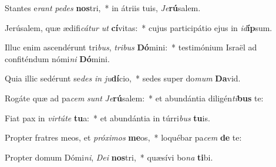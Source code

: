 \item Stantes e\textit{rant} \textit{pe}\textit{des} \textbf{nos}tri,~* in átriis tuis, \textit{Je}\textbf{rú}salem.
\item Jerúsalem, quæ ædifi\textit{cá}\textit{tur} \textit{ut} \textbf{cí}vitas:~* cujus participátio ejus in \textit{id}\textbf{íp}sum.
\item Illuc enim ascendérunt tri\textit{bus}, \textit{tri}\textit{bus} \textbf{Dó}mini:~* testimónium Israël ad confiténdum nómi\textit{ni} \textbf{Dó}mini.
\item Quia illic sedérunt se\textit{des} \textit{in} \textit{ju}\textbf{dí}cio,~* sedes super do\textit{mum} \textbf{Da}vid.
\item Rogáte quæ ad pa\textit{cem} \textit{sunt} \textit{Je}\textbf{rú}salem:~* et abundántia diligén\textit{ti}\textbf{bus} te:
\item Fiat pax in \textit{vir}\textit{tú}\textit{te} \textbf{tu}a:~* et abundántia in túrri\textit{bus} \textbf{tu}is.
\item Propter fratres meos, et \textit{pró}\textit{xi}\textit{mos} \textbf{me}os,~* loquébar pa\textit{cem} \textbf{de} te:
\item Propter domum Dómi\textit{ni}, \textit{De}\textit{i} \textbf{nos}tri,~* quæsívi bo\textit{na} \textbf{ti}bi.
